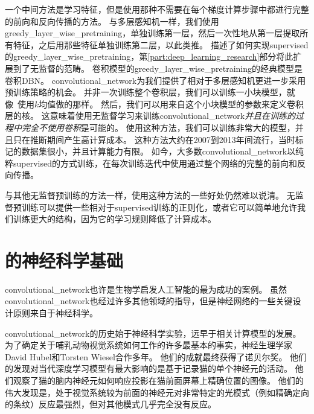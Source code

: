 一个中间方法是学习特征，但是使用那种不需要在每个梯度计算步骤中都进行完整的前向和反向传播的方法。
与多层感知机一样，我们使用\gls{greedy_layer_wise_pretraining}，单独训练第一层，然后一次性地从第一层提取所有特征，之后用那些特征单独训练第二层，以此类推。
描述了如何实现\gls{supervised}的\gls{greedy_layer_wise_pretraining}，第\ref{part:deep_learning_research}部分将此扩展到了无监督的范畴。
卷积模型的\gls{greedy_layer_wise_pretraining}的经典模型是卷积\gls{DBN}\citep{HonglakL2009}。
\gls{convolutional_network}为我们提供了相对于多层感知机更进一步采用预训练策略的机会。
并非一次训练整个卷积层，我们可以训练一小块模型，就像~\cite{Coates2011}使用$k$均值做的那样。
然后，我们可以用来自这个小块模型的参数来定义卷积层的核。
这意味着使用无监督学习来训练\gls{convolutional_network}\emph{并且在训练的过程中完全不使用卷积}是可能的。
使用这种方法，我们可以训练非常大的模型，并且只在推断期间产生高计算成本\citep{ranzato-cvpr-07-small,Jarrett-ICCV2009-small,koray-nips-10-small,icml2013_coates13}。
这种方法大约在2007到2013年间流行，当时标记的数据集很小，并且计算能力有限。
如今，大多数\gls{convolutional_network}以纯粹\gls{supervised}的方式训练，在每次训练迭代中使用通过整个网络的完整的前向和反向传播。
 
 
与其他无监督预训练的方法一样，使用这种方法的一些好处仍然难以说清。
无监督预训练可以提供一些相对于\gls{supervised}训练的正则化，或者它可以简单地允许我们训练更大的结构，因为它的学习规则降低了计算成本。

\section{的神经科学基础}
\label{sec:the_neuroscientific_basis_for_convolutional_networks}

\gls{convolutional_network}也许是生物学启发人工智能的最为成功的案例。
虽然\gls{convolutional_network}也经过许多其他领域的指导，但是神经网络的一些关键设计原则来自于神经科学。

\gls{convolutional_network}的历史始于神经科学实验，远早于相关计算模型的发展。
为了确定关于哺乳动物视觉系统如何工作的许多最基本的事实，神经生理学家David Hubel和Torsten Wiesel合作多年\citep{Hubel+Wiesel-1959,Hubel62,Hubel+Wiesel-1968}。
他们的成就最终获得了诺贝尔奖。
他们的发现对当代深度学习模型有最大影响的是基于记录猫的单个神经元的活动。
他们观察了猫的脑内神经元如何响应投影在猫前面屏幕上精确位置的图像。
他们的伟大发现是，处于视觉系统较为前面的神经元对非常特定的光模式（例如精确定向的条纹）反应最强烈，但对其他模式几乎完全没有反应。


